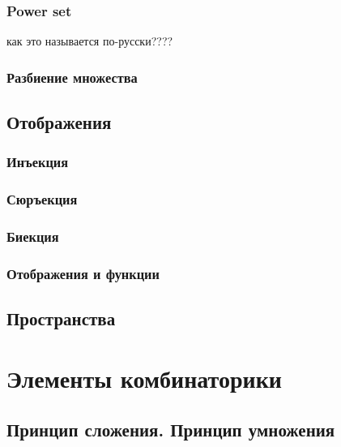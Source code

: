 \documentclass[
  letterpaper,
  DIV=11,
  numbers=noendperiod]{scrreprt}
\theoremstyle{definition}
\theoremstyle{remark}
\begin{document}
\subsection{Power set}\label{math-settheory-operation-powerset}

как это называется по-русски????

\subsection{Разбиение множества}\label{math-settheory-operation-class}

\section{Отображения}\label{math-settheory-mapping}

\subsection{Инъекция}\label{math-settheory-mapping-injection}

\subsection{Сюръекция}\label{math-settheory-mapping-surjection}

\subsection{Биекция}\label{math-settheory-mapping-bijection}

\subsection{Отображения и
функции}\label{math-settheory-mapping-functions}

\section{Пространства}\label{math-settheory-mapping-spaces}


\chapter{Элементы комбинаторики}\label{math-combinatorics}

\section{Принцип сложения. Принцип
умножения}\label{ux43fux440ux438ux43dux446ux438ux43f-ux441ux43bux43eux436ux435ux43dux438ux44f.-ux43fux440ux438ux43dux446ux438ux43f-ux443ux43cux43dux43eux436ux435ux43dux438ux44f}
\end{document}
